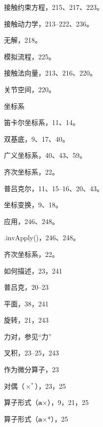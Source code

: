 \documentclass[10pt,a4paper]{book}
\theoremstyle{thmstyle} %
\theoremstyle{defstyle} %
\theoremstyle{prostyle} %
\begin{document}
接触约束方程，215、217、223。



接触动力学，213–222、236。



无解，218。



模拟流程，225。



接触法向量，213、216、220。



关节空间，220。



坐标系



笛卡尔坐标系，11、14。



双基底，9、17、40。



广义坐标系，40、43、59。



齐次坐标系，22。



普吕克尔，11、15–16、20、43。



坐标变换，9、18。



应用，246、248。



.invApply()，246、248。



齐次坐标系，22。



如何描述，23，241



普吕克，20–23



平面，38，241



旋转，21，243



力对，参见“力”



叉积，23–25，243



作为微分算子，23



对偶（$\times^{*}$），23，25



算子形式（$\boldsymbol{a}$×），9，21，25



算子形式（$\boldsymbol{a}$×*），25
\end{document}
